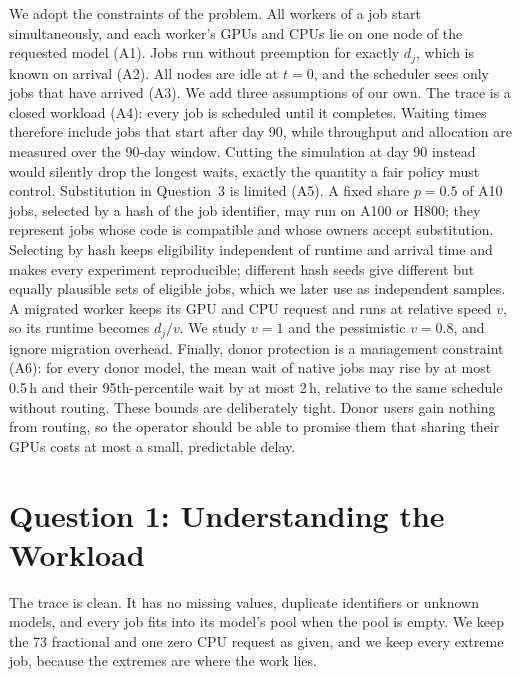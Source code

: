\documentclass[11pt,a4paper]{article}
\begin{document}
We adopt the constraints of the problem. All workers of a job start simultaneously, and each worker's GPUs and CPUs lie on one node of the requested model (A1). Jobs run without preemption for exactly $d_j$, which is known on arrival (A2). All nodes are idle at $t=0$, and the scheduler sees only jobs that have arrived (A3). We add three assumptions of our own. The trace is a closed workload (A4): every job is scheduled until it completes. Waiting times therefore include jobs that start after day 90, while throughput and allocation are measured over the 90-day window. Cutting the simulation at day 90 instead would silently drop the longest waits, exactly the quantity a fair policy must control. Substitution in Question~3 is limited (A5). A fixed share $p=0.5$ of A10 jobs, selected by a hash of the job identifier, may run on A100 or H800; they represent jobs whose code is compatible and whose owners accept substitution. Selecting by hash keeps eligibility independent of runtime and arrival time and makes every experiment reproducible; different hash seeds give different but equally plausible sets of eligible jobs, which we later use as independent samples. A migrated worker keeps its GPU and CPU request and runs at relative speed $v$, so its runtime becomes $d_j/v$. We study $v=1$ and the pessimistic $v=0.8$, and ignore migration overhead. Finally, donor protection is a management constraint (A6): for every donor model, the mean wait of native jobs may rise by at most 0.5\,h and their 95th-percentile wait by at most 2\,h, relative to the same schedule without routing. These bounds are deliberately tight. Donor users gain nothing from routing, so the operator should be able to promise them that sharing their GPUs costs at most a small, predictable delay.

\section{Question 1: Understanding the Workload}

The trace is clean. It has no missing values, duplicate identifiers or unknown models, and every job fits into its model's pool when the pool is empty. We keep the 73 fractional and one zero CPU request as given, and we keep every extreme job, because the extremes are where the work lies.
\end{document}

